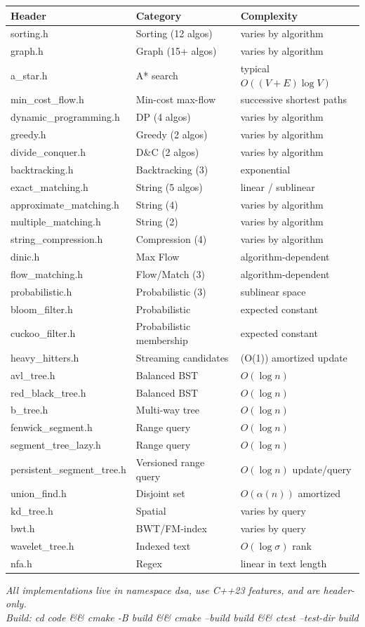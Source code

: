 \documentclass[11pt]{article}
\begin{document}
\begin{center}
\small
\begin{tabular}{@{}lll@{}}
\toprule
\textbf{Header} & \textbf{Category} & \textbf{Complexity} \\
\midrule
sorting.h & Sorting (12 algos) & varies by algorithm \\
graph.h & Graph (15+ algos) & varies by algorithm \\
a\_star.h & A* search & typical $O((V+E)\log V)$ \\
min\_cost\_flow.h & Min-cost max-flow & successive shortest paths \\
dynamic\_programming.h & DP (4 algos) & varies by algorithm \\
greedy.h & Greedy (2 algos) & varies by algorithm \\
divide\_conquer.h & D\&C (2 algos) & varies by algorithm \\
backtracking.h & Backtracking (3) & exponential \\
exact\_matching.h & String (5 algos) & linear / sublinear \\
approximate\_matching.h & String (4) & varies by algorithm \\
multiple\_matching.h & String (2) & varies by algorithm \\
string\_compression.h & Compression (4) & varies by algorithm \\
dinic.h & Max Flow & algorithm-dependent \\
flow\_matching.h & Flow/Match (3) & algorithm-dependent \\
probabilistic.h & Probabilistic (3) & sublinear space \\
bloom\_filter.h & Probabilistic & expected constant \\
cuckoo\_filter.h & Probabilistic membership & expected constant \\
heavy\_hitters.h & Streaming candidates & (O(1)) amortized update \\
avl\_tree.h & Balanced BST & \(O(\log n)\) \\
red\_black\_tree.h & Balanced BST & \(O(\log n)\) \\
b\_tree.h & Multi-way tree & \(O(\log n)\) \\
fenwick\_segment.h & Range query & \(O(\log n)\) \\
segment\_tree\_lazy.h & Range query & \(O(\log n)\) \\
persistent\_segment\_tree.h & Versioned range query & \(O(\log n)\) update/query \\
union\_find.h & Disjoint set & \(O(\alpha(n))\) amortized \\
kd\_tree.h & Spatial & varies by query \\
bwt.h & BWT/FM-index & varies by query \\
wavelet\_tree.h & Indexed text & \(O(\log \sigma)\) rank \\
nfa.h & Regex & linear in text length \\
\bottomrule
\end{tabular}
\end{center}

\vfill
\begin{center}
\small\textit{All implementations live in namespace dsa, use C++23 features,
and are header-only.}\\
\textit{Build: cd code \&\& cmake -B build \&\& cmake --build build \&\& ctest --test-dir build}
\end{center}
\end{document}
